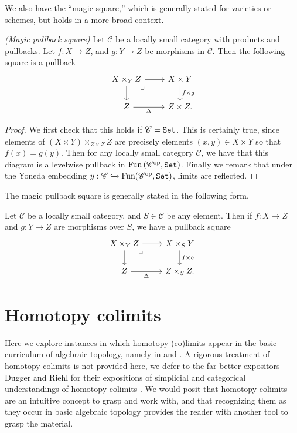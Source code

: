 We also have the ``magic square,'' which is generally stated for varieties or schemes, but holds in a more broad context.

\begin{proposition}\label{prop:magic-pullback-square} \textit{(Magic pullback square)} Let $\mathscr{C}$ be a locally small category with products and pullbacks. Let $f: X \to Z$, and $g: Y \to Z$ be morphisms in $\mathscr{C}$. Then the following square is a pullback
\[ \begin{tikzcd}
    X \times_Y Z\rar\dar\pb & X \times Y\dar["f \times g" right]\\
    Z\rar["\Delta" below] & Z \times Z.
\end{tikzcd} \]
\end{proposition}
\begin{proof} We first check that this holds if $\mathscr{C} = \texttt{Set}$. This is certainly true, since elements of $(X \times Y)\times_{Z \times Z} Z$ are precisely elements $(x,y) \in X \times Y$ so that $f(x) = g(y)$. Then for any locally small category $\mathscr{C}$, we have that this diagram is a levelwise pullback in $\text{Fun} \left( \mathscr{C}^{\text{op}}, \texttt{Set} \right)$. Finally we remark that under the Yoneda embedding $y : \mathscr{C} \xhookrightarrow{} \text{Fun}(\mathscr{C}^{\text{op}}, \texttt{Set})$, limits are reflected.
\end{proof}

The magic pullback square is generally stated in the following form.

\begin{corollary}\label{cor:magic-square-over-S} Let $\mathscr{C}$ be a locally small category, and $S\in \mathscr{C}$ be any element. Then if $f: X \to Z$ and $g : Y \to Z$ are morphisms over $S$, we have a pullback square
\[ \begin{tikzcd}
    X \times_Y Z\rar\dar\pb & X \times_S Y\dar["f \times g"]\\
    Z\rar["\Delta" below] & Z \times_S Z.
\end{tikzcd} \]
\end{corollary}


\section{Homotopy colimits}

Here we explore instances in which homotopy (co)limits appear in the basic curriculum of algebraic topology, namely in \cite{Hatcher} and \cite{May}. A rigorous treatment of homotopy colimits is not provided here, we defer to the far better expositors Dugger and Riehl for their expositions of simplicial and categorical understandings of homotopy colimits \cite{Dugger,Riehl-hocolims}. We would posit that homotopy colimits are an intuitive concept to grasp and work with, and that recognizing them as they occur in basic algebraic topology provides the reader with another tool to grasp the material.


